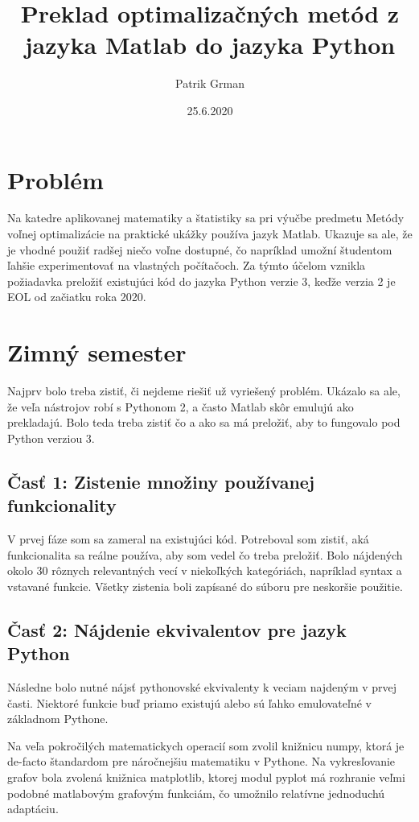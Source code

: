 \documentclass[12pt,a4paper]{article}
\title{Preklad optimalizačných metód z jazyka Matlab do jazyka Python}
\author{Patrik Grman}
\date{25.6.2020}
\begin{document}
\maketitle

\section*{Problém}

Na katedre aplikovanej matematiky a štatistiky sa pri výučbe predmetu Metódy voľnej optimalizácie na praktické ukážky používa jazyk Matlab.
Ukazuje sa ale, že je vhodné použiť radšej niečo voľne dostupné, čo napríklad umožní študentom ľahšie experimentovať na vlastných počítačoch.
Za týmto účelom vznikla požiadavka preložiť existujúci kód do jazyka Python verzie 3, keďže verzia 2 je EOL od začiatku roka 2020.

\section*{Zimný semester}

Najprv bolo treba zistiť, či nejdeme riešiť už vyriešený problém.
Ukázalo sa ale, že veľa nástrojov robí s Pythonom 2, a často Matlab skôr emulujú ako prekladajú.
Bolo teda treba zistiť čo a ako sa má preložiť, aby to fungovalo pod Python verziou 3.

\subsection*{Časť 1: Zistenie množiny používanej funkcionality}

V prvej fáze som sa zameral na existujúci kód.
Potreboval som zistiť, aká funkcionalita sa reálne používa, aby som vedel čo treba preložiť.
Bolo nájdených okolo 30 rôznych relevantných vecí v niekoľkých kategóriách, napríklad syntax a vstavané funkcie.
Všetky zistenia boli zapísané do súboru pre neskoršie použitie.

\subsection*{Časť 2: Nájdenie ekvivalentov pre jazyk Python}

Následne bolo nutné nájsť pythonovské ekvivalenty k veciam najdeným v prvej časti.
Niektoré funkcie buď priamo existujú alebo sú ľahko emulovateľné v základnom Pythone.

Na veľa pokročilých matematickych operacií som zvolil knižnicu numpy, ktorá je de-facto štandardom pre náročnejšiu matematiku v Pythone.
Na vykresľovanie grafov bola zvolená knižnica matplotlib, ktorej modul pyplot má rozhranie veľmi podobné matlabovým grafovým funkciám, čo umožnilo relatívne jednoduchú adaptáciu.
\end{document}
